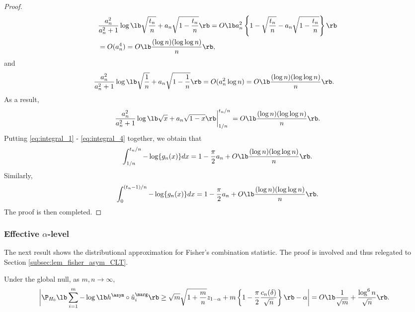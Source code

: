 \begin{proof}
\begin{align*}
    &\frac{a_n^2}{a_n^2 + 1}\log\lb \sqrt{\frac{t_n}{n}} + a_n\sqrt{1 - \frac{t_n}{n}}\rb = O\lb a_n^2\left\{1 - \sqrt{\frac{t_n}{n}} - a_n\sqrt{1 - \frac{t_n}{n}}\right\}\rb\\
    &= O(a_n^4) = O\lb\frac{(\log n)(\log\log n)}{n}\rb,
  \end{align*}
  and
  \begin{align*}
    &\frac{a_n^2}{a_n^2 + 1}\log\lb \sqrt{\frac{1}{n}} + a_n\sqrt{1 - \frac{1}{n}}\rb = O(a_n^2 \log n) = O\lb\frac{(\log n)(\log\log n)}{n}\rb.
  \end{align*}
  As a result,
  \begin{equation}
    \label{eq:integral_4}
    \frac{a_n^2}{a_n^2 + 1}\log\lb \sqrt{x} + a_n\sqrt{1 - x}\rb\bigg|_{1/n}^{t_n/n} = O\lb\frac{(\log n)(\log\log n)}{n}\rb.
  \end{equation}
  Putting \eqref{eq:integral_1} - \eqref{eq:integral_4} together, we obtain that
  \[\int_{1/n}^{t_n / n}-\log \{g_n(x)\}dx = 1 - \frac{\pi}{2}a_n + O\lb\frac{(\log n)(\log \log n)}{n}\rb.\]
  Similarly,
  \[\int_{0}^{(t_n - 1) / n}-\log \{g_n(x)\}dx = 1 - \frac{\pi}{2}a_n + O\lb\frac{(\log n)(\log \log n)}{n}\rb.\]
  The proof is then completed.
\end{proof}

\subsubsection{Effective $\alpha$-level}
The next result shows the distributional approximation for Fisher's combination statistic. The proof is involved and thus relegated to Section \ref{subsec:lem_fisher_asym_CLT}.
\begin{lemma}\label{lem:fisher_asym_CLT}
  Under the global null, as $m, n\rightarrow \infty$,
  \begin{align*}
    &\bigg|\P_{H_0}\lb \sum_{i=1}^{m}-\log\lb h^{\asym}\circ \hat{u}^\marg_i\rb\ge \sqrt{m}\sqrt{1 + \frac{m}{n}}z_{1- \alpha} + m \left\{ 1 - \frac{\pi}{2}\frac{c_n(\delta)}{\sqrt{n}}\right\}\rb - \alpha\bigg|
     = O\lb \frac{1}{\sqrt{m}} + \frac{\log^6 n}{\sqrt{n}}\rb.
  \end{align*}
\end{lemma}

